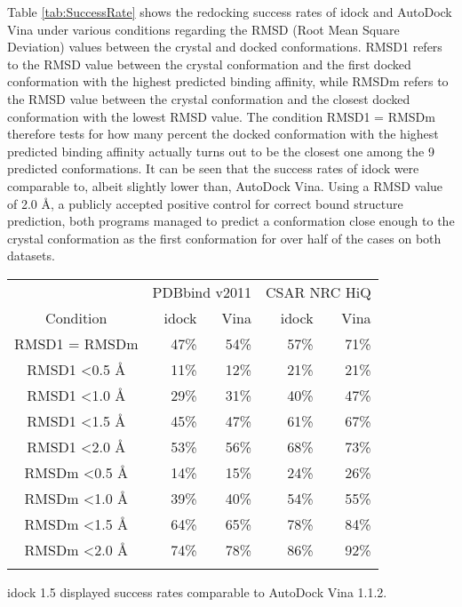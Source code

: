 \documentclass{bioinfo}
\begin{document}
Table \ref{tab:SuccessRate} shows the redocking success rates of idock and AutoDock Vina under various conditions regarding the RMSD (Root Mean Square Deviation) values between the crystal and docked conformations. RMSD1 refers to the RMSD value between the crystal conformation and the first docked conformation with the highest predicted binding affinity, while RMSDm refers to the RMSD value between the crystal conformation and the closest docked conformation with the lowest RMSD value. The condition RMSD1 = RMSDm therefore tests for how many percent the docked conformation with the highest predicted binding affinity actually turns out to be the closest one among the 9 predicted conformations. It can be seen that the success rates of idock were comparable to, albeit slightly lower than, AutoDock Vina. Using a RMSD value of 2.0 \AA, a publicly accepted positive control for correct bound structure prediction, both programs managed to predict a conformation close enough to the crystal conformation as the first conformation for over half of the cases on both datasets.

\begin{table}
{\begin{tabular}{crrrr}
\toprule
& \multicolumn{2}{c}{PDBbind v2011} & \multicolumn{2}{c}{CSAR NRC HiQ}\\
Condition & idock & Vina & idock & Vina\\
\midrule
RMSD1 = RMSDm           & 47\% & 54\% & 57\% & 71\%\\
RMSD1 \textless 0.5 \AA & 11\% & 12\% & 21\% & 21\%\\
RMSD1 \textless 1.0 \AA & 29\% & 31\% & 40\% & 47\%\\
RMSD1 \textless 1.5 \AA & 45\% & 47\% & 61\% & 67\%\\
RMSD1 \textless 2.0 \AA & 53\% & 56\% & 68\% & 73\%\\
RMSDm \textless 0.5 \AA & 14\% & 15\% & 24\% & 26\%\\
RMSDm \textless 1.0 \AA & 39\% & 40\% & 54\% & 55\%\\
RMSDm \textless 1.5 \AA & 64\% & 65\% & 78\% & 84\%\\
RMSDm \textless 2.0 \AA & 74\% & 78\% & 86\% & 92\%\\
\botrule
\end{tabular}}{idock 1.5 displayed success rates comparable to AutoDock Vina 1.1.2.}
\end{table}
\end{document}
